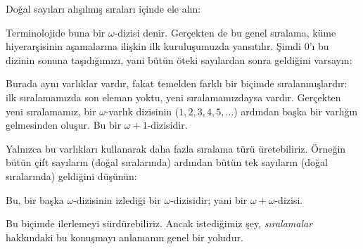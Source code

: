 \documentclass[../../../include/open-logic-section]{subfiles}
\begin{document}

Doğal sayıları alışılmış sıraları içinde ele alın:
\begin{center}
\end{center}
Terminolojide buna bir $\omega$-dizisi denir. Gerçekten de bu genel
sıralama, küme hiyerarşisinin aşamalarına ilişkin ilk kuruluşumuzda
yansıtılır. Şimdi $0$'ı bu dizinin sonuna taşıdığımızı, yani bütün öteki
sayılardan sonra geldiğini varsayın:
\begin{center}
\end{center}
Burada aynı varlıklar vardır, fakat temelden farklı bir biçimde
sıralanmışlardır: ilk sıralamamızda son eleman yoktu, yeni sıralamamızdaysa
vardır. Gerçekten yeni sıralamamız, bir $\omega$-varlık dizisinin
($1,2,3,4,5,\ldots$) ardından başka bir varlığın gelmesinden oluşur. Bu
bir $\omega+1$-dizisidir.

Yalnızca bu varlıkları kullanarak daha fazla sıralama türü üretebiliriz.
Örneğin bütün çift sayıların (doğal sıralarında) ardından bütün tek
sayıların (doğal sıralarında) geldiğini düşünün:
\begin{center}
\end{center}
Bu, bir başka $\omega$-dizisinin izlediği bir $\omega$-dizisidir; yani
bir $\omega+\omega$-dizisi.

Bu biçimde ilerlemeyi sürdürebiliriz. Ancak istediğimiz şey,
\emph{sıralamalar} hakkındaki bu konuşmayı anlamanın genel bir yoludur.
\end{document}
